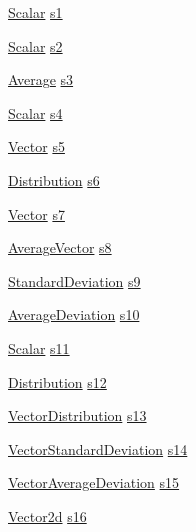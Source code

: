 \begin{DoxyCompactItemize}
\item 
\hyperlink{classStats_1_1Scalar}{Scalar} \hyperlink{structStatTest_a2afda9f52914afebd43742818c27a1bf}{s1}
\item 
\hyperlink{classStats_1_1Scalar}{Scalar} \hyperlink{structStatTest_a3c4e8e84e976241b32be26639dc630db}{s2}
\item 
\hyperlink{classStats_1_1Average}{Average} \hyperlink{structStatTest_afa0cc7c756311f1ed32397be2bf0fba5}{s3}
\item 
\hyperlink{classStats_1_1Scalar}{Scalar} \hyperlink{structStatTest_ac3de08a61aeeab158de9bb15adfb5aac}{s4}
\item 
\hyperlink{classStats_1_1Vector}{Vector} \hyperlink{structStatTest_a378d2b1ff2e47c5106f93ff5ac9a8582}{s5}
\item 
\hyperlink{classStats_1_1Distribution}{Distribution} \hyperlink{structStatTest_a8f03708ad715aa935a940235c6592458}{s6}
\item 
\hyperlink{classStats_1_1Vector}{Vector} \hyperlink{structStatTest_a0c506a7cfb55f45194895569a3e5d8b4}{s7}
\item 
\hyperlink{classStats_1_1AverageVector}{AverageVector} \hyperlink{structStatTest_a696649756758760e13bca9954c601e83}{s8}
\item 
\hyperlink{classStats_1_1StandardDeviation}{StandardDeviation} \hyperlink{structStatTest_ab6009c1c23dd54521e3a91b118c10796}{s9}
\item 
\hyperlink{classStats_1_1AverageDeviation}{AverageDeviation} \hyperlink{structStatTest_a32ecd7ddbab5291a40b3c10a93ff6a3a}{s10}
\item 
\hyperlink{classStats_1_1Scalar}{Scalar} \hyperlink{structStatTest_a182cd867a455359d090d965e5f245956}{s11}
\item 
\hyperlink{classStats_1_1Distribution}{Distribution} \hyperlink{structStatTest_af0be7cbd46cef37134d65c1e400381a1}{s12}
\item 
\hyperlink{classStats_1_1VectorDistribution}{VectorDistribution} \hyperlink{structStatTest_ab6e44af47f80f454447812f1793d1db7}{s13}
\item 
\hyperlink{classStats_1_1VectorStandardDeviation}{VectorStandardDeviation} \hyperlink{structStatTest_ad25d3ed40911e3da975057f67a309366}{s14}
\item 
\hyperlink{classStats_1_1VectorAverageDeviation}{VectorAverageDeviation} \hyperlink{structStatTest_a3f10622e9c70f600ed1f1868e3bab5a9}{s15}
\item 
\hyperlink{classStats_1_1Vector2d}{Vector2d} \hyperlink{structStatTest_a84e69dd40910b0391ec3f325a94e86b4}{s16}

\end{DoxyCompactItemize}
